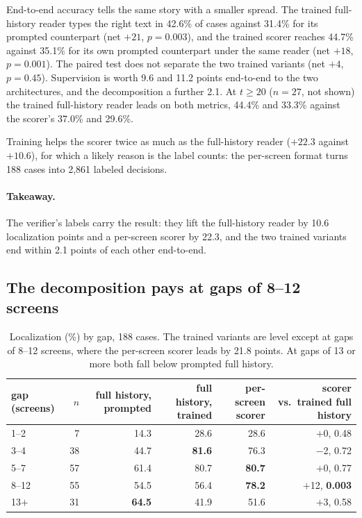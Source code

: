 End-to-end accuracy tells the same story with a smaller spread. The trained full-history reader types the right text in 42.6\% of cases against 31.4\% for its prompted counterpart (net $+21$, $p=0.003$), and the trained scorer reaches 44.7\% against 35.1\% for its own prompted counterpart under the same reader (net $+18$, $p=0.001$). The paired test does not separate the two trained variants (net $+4$, $p=0.45$). Supervision is worth 9.6 and 11.2 points end-to-end to the two architectures, and the decomposition a further 2.1. At $t\ge20$ ($n=27$, not shown) the trained full-history reader leads on both metrics, 44.4\% and 33.3\% against the scorer's 37.0\% and 29.6\%.

Training helps the scorer twice as much as the full-history reader ($+22.3$ against $+10.6$), for which a likely reason is the label counts: the per-screen format turns 188 cases into 2,861 labeled decisions.

\paragraph{Takeaway.} The verifier's labels carry the result: they lift the full-history reader by 10.6 localization points and a per-screen scorer by 22.3, and the two trained variants end within 2.1 points of each other end-to-end.

\subsection{The decomposition pays at gaps of 8--12 screens}
\label{sec:gap}
\begin{table}[t]
\centering\scriptsize
\caption{Localization (\%) by gap, 188 cases. The trained variants are level except at gaps of 8--12 screens, where the per-screen scorer leads by 21.8 points. At gaps of 13 or more both fall below prompted full history.}
\label{tab:gap}
\begin{tabular}{lrrrrr}
\toprule
gap (screens) & $n$ & full history, prompted & full history, trained & \textbf{per-screen scorer} & scorer vs.\ trained full history \\
\midrule
1--2 & 7 & 14.3 & 28.6 & 28.6 & $+$0, 0.48 \\
3--4 & 38 & 44.7 & \textbf{81.6} & 76.3 & $-$2, 0.72 \\
5--7 & 57 & 61.4 & 80.7 & \textbf{80.7} & $+$0, 0.77 \\
8--12 & 55 & 54.5 & 56.4 & \textbf{78.2} & $+$12, \textbf{0.003} \\
13$+$ & 31 & \textbf{64.5} & 41.9 & 51.6 & $+$3, 0.58 \\
\bottomrule
\end{tabular}
\end{table}

